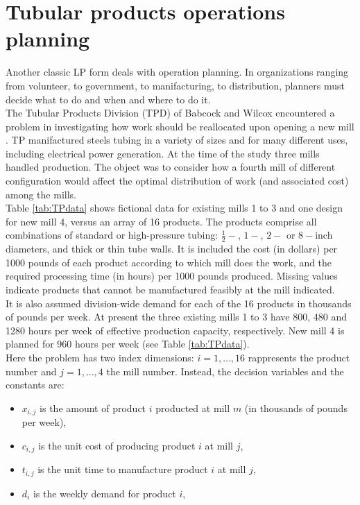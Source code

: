 \documentclass[a4paper,10 pt,titlepage,twoside]{report}
\theoremstyle{plain}
\theoremstyle{definition}
\theoremstyle{remark}
\begin{document}
{{\section{Tubular products operations planning}
Another classic LP form deals with operation planning. In organizations ranging from volunteer, to government, to manifacturing, to distribution, planners must decide what to do and when and where to do it.\\
The Tubular Products Division (TPD) of Babcock and Wilcox encountered a problem in investigating how work should be reallocated upon opening a new mill \cite{FEM}. TP manifactured steels tubing in a variety of sizes and for many different uses, including electrical power generation. At the time of the study three mills handled production. The object was to consider how a fourth mill of different configuration would affect the optimal distribution of work (and associated cost) among the mills.\\Table \ref{tab:TPdata} shows fictional data for existing mills 1 to 3 and one design for new mill 4, versus an array of 16 products. The products comprise all combinations of standard or high-pressure tubing: $\frac{1}{2}-$, $1-$, $2-$ or $8-$inch diameters, and thick or thin tube walls. It is included the cost (in dollars) per 1000 pounds of each product according to which mill does the work, and the required processing time (in hours) per 1000 pounds produced. Missing values indicate products that cannot be manufactured feasibly at the mill indicated.\\
It is also assumed division-wide demand for each of the 16 products in thousands of pounds per week. At present the three existing mills 1 to 3 have 800, 480 and 1280 hours per week of effective production capacity, respectively. New mill 4 is planned for 960 hours per week (see Table \ref{tab:TPdata}).\\
Here the problem has two index dimensions: $i= 1, \dots, 16$ rappresents the product number and $j=1, \dots, 4$ the mill number. Instead, the decision variables and the constants are:
\begin{itemize}
	\item $x_{i,j}$ is the amount of product $i$ producted at mill $m$ (in thousands of pounds per week),
	\item $c_{i,j}$ is the unit cost of producing product $i$ at mill $j$,
	\item $t_{i,j}$ is the unit time to manufacture product $i$ at mill $j$,
	\item $d_{i}$ is the weekly demand for product $i$,

\end{itemize}}}
\end{document}
